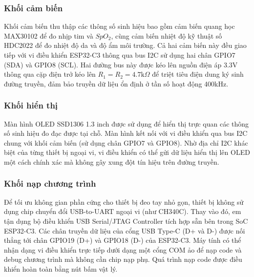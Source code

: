 \subsubsection{Khối cảm biến}
Khối cảm biến thu thập các thông số sinh hiệu bao gồm cảm biến quang học MAX30102 để đo nhịp tim và $SpO_2$, cùng cảm biến nhiệt độ kỹ thuật số HDC2022 để đo nhiệt độ da và độ ẩm môi trường. Cả hai cảm biến này đều giao tiếp với vi điều khiển ESP32-C3 thông qua bus I2C sử dụng hai chân GPIO7 (SDA) và GPIO8 (SCL). Hai đường bus này được kéo lên nguồn điện áp 3.3V thông qua cặp điện trở kéo lên $R_1 = R_2 = 4.7\text{k}\Omega$ để triệt tiêu điện dung ký sinh đường truyền, đảm bảo truyền dữ liệu ổn định ở tần số hoạt động 400kHz.

\subsubsection{Khối hiển thị}
Màn hình OLED SSD1306 1.3 inch được sử dụng để hiển thị trực quan các thông số sinh hiệu đo đạc được tại chỗ. Màn hình kết nối với vi điều khiển qua bus I2C chung với khối cảm biến (sử dụng chân GPIO7 và GPIO8). Nhờ địa chỉ I2C khác biệt của từng thiết bị ngoại vi, vi điều khiển có thể gửi dữ liệu hiển thị lên OLED một cách chính xác mà không gây xung đột tín hiệu trên đường truyền.

\subsubsection{Khối nạp chương trình}
Để tối ưu không gian phần cứng cho thiết bị đeo tay nhỏ gọn, thiết bị không sử dụng chip chuyển đổi USB-to-UART ngoại vi (như CH340C). Thay vào đó, em tận dụng bộ điều khiển USB Serial/JTAG Controller tích hợp sẵn bên trong SoC ESP32-C3. Các chân truyền dữ liệu của cổng USB Type-C (D+ và D-) được nối thẳng tới chân GPIO19 (D+) và GPIO18 (D-) của ESP32-C3. Máy tính có thể nhận dạng vi điều khiển trực tiếp dưới dạng một cổng COM ảo để nạp code và debug chương trình mà không cần chip nạp phụ. Quá trình nạp code được điều khiển hoàn toàn bằng nút bấm vật lý.

